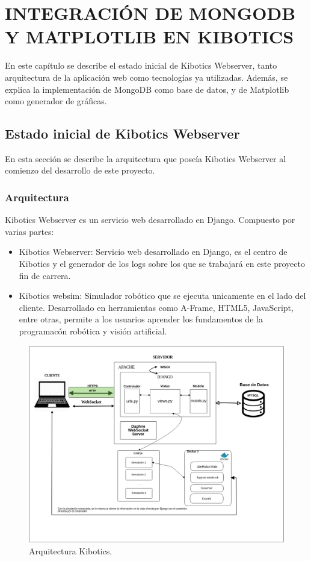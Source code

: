 \documentclass[11pt,a4paper]{book}
\begin{document}
	\chapter{INTEGRACIÓN DE MONGODB Y MATPLOTLIB EN KIBOTICS}
		En este capítulo se describe el estado inicial de Kibotics Webserver, tanto arquitectura de la aplicación web como tecnologías ya utilizadas. Además, se explica la implementación de MongoDB como base de datos, y de Matplotlib como generador de gráficas.
		\section{Estado inicial de Kibotics Webserver}
			En esta sección se describe la arquitectura que poseía Kibotics Webserver al comienzo del desarrollo de este proyecto.
			\subsection{Arquitectura}
				Kibotics Webserver es un servicio web desarrollado en Django. Compuesto por varias partes:
								\begin{itemize}
					\item Kibotics Webserver: Servicio web desarrollado en Django, es el centro de Kibotics y el generador de los logs sobre los que se trabajará en este proyecto fin de carrera.
							
					
					\item Kibotics websim: Simulador robótico que se ejecuta unicamente en el lado del cliente. Desarrollado en herramientas como A-Frame, HTML5, JavaScript, entre otras, permite a los usuarios aprender los fundamentos de la programacón robótica y visión artificial.

					
				\end{itemize}
				
				\begin{figure}[H]
					\centering
					\includegraphics[width=13cm, keepaspectratio]{img/esquema_Kibotics.png}
					\caption{Arquitectura Kibotics.}
					\label{fig:arquitectura_kibotics}
				\end{figure}
			
\end{document}
